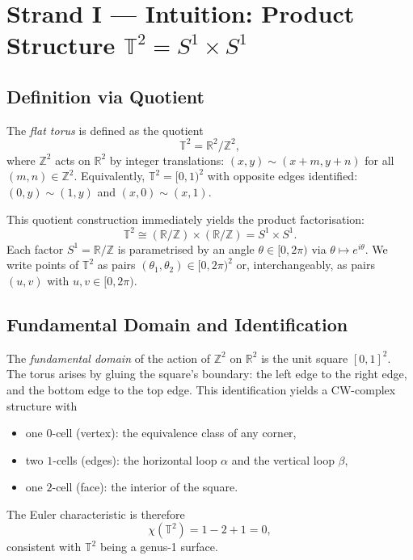 \section{Strand I — Intuition: Product Structure
  \texorpdfstring{$\mathbb{T}^2 = S^1 \times S^1$}{T2=S1xS1}}
\label{sec:ch18-product}

\subsection{Definition via Quotient}\label{subsec:ch18-quotient}

The \emph{flat torus} is defined as the quotient
\begin{equation}\label{eq:torus-quotient}
  \mathbb{T}^2 = \mathbb{R}^2 / \mathbb{Z}^2,
\end{equation}
where $\mathbb{Z}^2$ acts on $\mathbb{R}^2$ by integer translations:
$(x,y) \sim (x+m, y+n)$ for all $(m,n) \in \mathbb{Z}^2$.
Equivalently, $\mathbb{T}^2 = [0,1)^2$ with opposite edges identified:
$(0,y) \sim (1,y)$ and $(x,0) \sim (x,1)$.

This quotient construction immediately yields the product factorisation:
\begin{equation}\label{eq:torus-product}
  \mathbb{T}^2 \cong ({\mathbb{R}}/{\mathbb{Z}}) \times ({\mathbb{R}}/{\mathbb{Z}}) = S^1 \times S^1.
\end{equation}
Each factor $S^1 = \mathbb{R}/\mathbb{Z}$ is parametrised by an angle
$\theta \in [0, 2\pi)$ via $\theta \mapsto e^{i\theta}$.
We write points of $\mathbb{T}^2$ as pairs $(\theta_1, \theta_2) \in [0,2\pi)^2$
or, interchangeably, as pairs $(u,v)$ with $u,v \in [0,2\pi)$.

\subsection{Fundamental Domain and Identification}\label{subsec:ch18-fund-domain}

The \emph{fundamental domain} of the action of $\mathbb{Z}^2$ on $\mathbb{R}^2$ is
the unit square $[0,1]^2$.
The torus arises by gluing the square's boundary: the left edge to the right edge,
and the bottom edge to the top edge.
This identification yields a CW-complex structure with
\begin{itemize}
\item one $0$-cell (vertex): the equivalence class of any corner,
\item two $1$-cells (edges): the horizontal loop $\alpha$ and the vertical loop $\beta$,
\item one $2$-cell (face): the interior of the square.
\end{itemize}
The Euler characteristic is therefore
\begin{equation}
  \chi(\mathbb{T}^2) = 1 - 2 + 1 = 0,
\end{equation}
consistent with $\mathbb{T}^2$ being a genus-1 surface.

